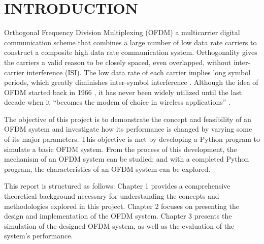 \section*{INTRODUCTION}

Orthogonal Frequency Division Multiplexing (OFDM) a multicarrier digital communication scheme that combines a large number of low data rate carriers to construct a composite high data rate communication system. Orthogonality gives the carriers a valid reason to be closely spaced, even overlapped, without inter-carrier interference (ISI). The low data rate of each carrier implies long symbol periods, which greatly diminishes inter-symbol interference \cite{b3}. Although the idea of OFDM started back in 1966 \cite{b4}, it has never been widely utilized until the last decade when it “becomes the modem of choice in wireless applications” \cite{b5}.

The objective of this project is to demonstrate the concept and feasibility of an OFDM system and investigate how its performance is changed by varying some of its major parameters. This objective is met by developing a Python program to simulate a basic OFDM system. From the process of this development, the mechanism of an OFDM system can be studied; and with a completed Python program, the characteristics of an OFDM system can be explored.

This report is structured as follows: Chapter 1 provides a comprehensive theoretical background necessary for understanding the concepts and methodologies explored in this project. Chapter 2 focuses on presenting the design and implementation of the OFDM system. Chapter 3 presents the simulation of the designed OFDM system, as well as the evaluation of the system's performance.